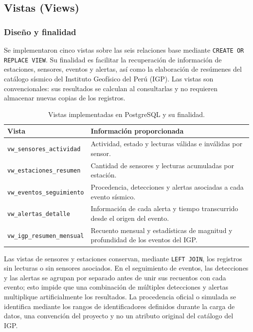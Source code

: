 \documentclass[12pt,a4paper]{article}
\begin{document}
\subsection{Vistas (Views)}
\label{sec:vistas-proyecto}

\subsubsection*{Diseño y finalidad}

Se implementaron cinco vistas sobre las seis relaciones base mediante
\texttt{CREATE OR REPLACE VIEW}. Su finalidad es facilitar la recuperación
de información de estaciones, sensores, eventos y alertas, así como
la elaboración de resúmenes del catálogo sísmico del Instituto Geofísico
del Perú (IGP). Las vistas son convencionales: sus resultados se calculan
al consultarlas y no requieren almacenar nuevas copias de los registros.

\begin{table}[H]
\centering\small
\begin{tabular}{>{\raggedright\arraybackslash}p{5.2cm}>{\raggedright\arraybackslash}p{8.7cm}}
\toprule
\textbf{Vista} & \textbf{Información proporcionada} \\
\midrule
\texttt{vw\_sensores\_actividad} & Actividad, estado y lecturas válidas e inválidas por sensor. \\
\texttt{vw\_estaciones\_resumen} & Cantidad de sensores y lecturas acumuladas por estación. \\
\texttt{vw\_eventos\_seguimiento} & Procedencia, detecciones y alertas asociadas a cada evento sísmico. \\
\texttt{vw\_alertas\_detalle} & Información de cada alerta y tiempo transcurrido desde el origen del evento. \\
\texttt{vw\_igp\_resumen\_mensual} & Recuento mensual y estadísticas de magnitud y profundidad de los eventos del IGP. \\
\bottomrule
\end{tabular}
\caption{Vistas implementadas en PostgreSQL y su finalidad.}
\label{tab:vistas-44}
\end{table}

Las vistas de sensores y estaciones conservan, mediante
\texttt{LEFT JOIN}, los registros sin lecturas o sin sensores asociados.
En el seguimiento de eventos, las detecciones y las alertas se agrupan
por separado antes de unir sus recuentos con cada evento; esto impide
que una combinación de múltiples detecciones y alertas multiplique
artificialmente los resultados. La procedencia oficial o simulada se
identifica mediante los rangos de identificadores definidos durante
la carga de datos, una convención del proyecto y no un atributo
original del catálogo del IGP.
\end{document}
